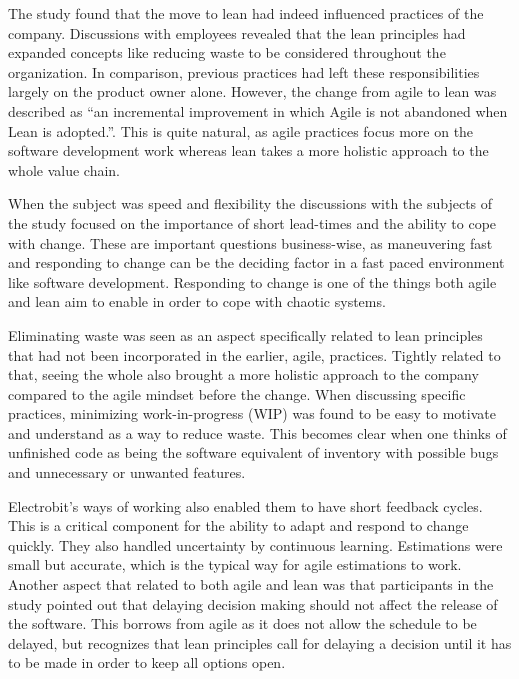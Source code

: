 The study found that the move to lean had indeed influenced practices of the company. Discussions with employees revealed that the lean principles had expanded concepts like reducing waste to be considered throughout the organization. In comparison, previous practices had left these responsibilities largely on the product owner alone. However, the change from agile to lean was described as ``an incremental improvement in which Agile is not abandoned when Lean is adopted.''\cite{Rodriguez2014Combining}. This is quite natural, as agile practices focus more on the software development work whereas lean takes a more holistic approach to the whole value chain.

When the subject was speed and flexibility the discussions with the subjects of the study focused on the importance of short lead-times and the ability to cope with change.\cite{Rodriguez2014Combining} These are important questions business-wise, as maneuvering fast and responding to change can be the deciding factor in a fast paced environment like software development. Responding to change is one of the things both agile and lean aim to enable in order to cope with chaotic systems.

Eliminating waste was seen as an aspect specifically related to lean principles that had not been incorporated in the earlier, agile, practices. Tightly related to that, seeing the whole also brought a more holistic approach to the company compared to the agile mindset before the change. When discussing specific practices, minimizing work-in-progress (WIP) was found to be easy to motivate and understand as a way to reduce waste.\cite{Rodriguez2014Combining} This becomes clear when one thinks of unfinished code as being the software equivalent of inventory with possible bugs and unnecessary or unwanted features.

Electrobit's ways of working also enabled them to have short feedback cycles. This is a critical component for the ability to adapt and respond to change quickly. They also handled uncertainty by continuous learning. Estimations were small but accurate, which is the typical way for agile estimations to work. Another aspect that related to both agile and lean was that participants in the study pointed out that delaying decision making should not affect the release of the software.\cite{Rodriguez2014Combining} This borrows from agile as it does not allow the schedule to be delayed, but recognizes that lean principles call for delaying a decision until it has to be made in order to keep all options open.

